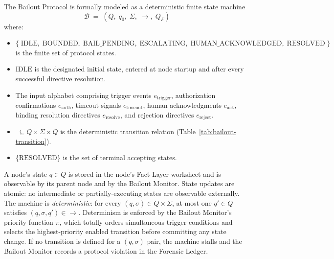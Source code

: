 The Bailout Protocol is formally modeled as a deterministic finite state machine
\begin{equation}
\mathcal{B} \;=\; (Q,\; q_0,\; \Sigma,\; \rightarrow,\; Q_F)
\end{equation}
where:

\begin{itemize}\itemsep=0pt
\item[$Q$] $\{\;\text{IDLE},\; \text{BOUNDED},\; \text{BAIL\_PENDING},\; \text{ESCALATING},\; \text{HUMAN\_ACKNOWLEDGED},\; \text{RESOLVED}\;\}$ is the finite set of protocol states.
\item[$q_0$] $\text{IDLE}$ is the designated initial state, entered at node startup and after every successful directive resolution.
\item[$\Sigma$] The input alphabet comprising trigger events $e_{\text{trigger}}$, authorization confirmations $e_{\text{auth}}$, timeout signals $e_{\text{timeout}}$, human acknowledgments $e_{\text{ack}}$, binding resolution directives $e_{\text{resolve}}$, and rejection directives $e_{\text{reject}}$.
\item[$\rightarrow$] $\;\subseteq Q \times \Sigma \times Q$ is the deterministic transition relation (Table~\ref{tab:bailout-transition}).
\item[$Q_F$] $\{\text{RESOLVED}\}$ is the set of terminal accepting states.
\end{itemize}

A node's state $q \in Q$ is stored in the node's Fact Layer worksheet and is observable by its parent node and by the Bailout Monitor. State updates are atomic: no intermediate or partially-executing states are observable externally. The machine is \emph{deterministic}: for every $(q, \sigma) \in Q \times \Sigma$, at most one $q' \in Q$ satisfies $(q, \sigma, q') \in \rightarrow$. Determinism is enforced by the Bailout Monitor's priority function $\pi$, which totally orders simultaneous trigger conditions and selects the highest-priority enabled transition before committing any state change. If no transition is defined for a $(q, \sigma)$ pair, the machine stalls and the Bailout Monitor records a protocol violation in the Forensic Ledger.

